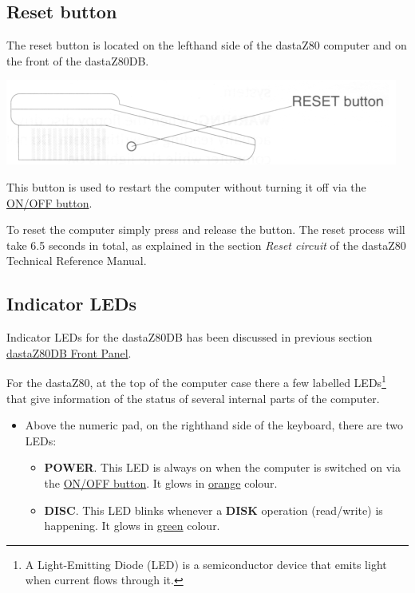     \subsection{Reset button}
    \label{subsec:resetbutton}

    The reset button is located on the lefthand side of the dastaZ80 computer
    and on the front of the dastaZ80DB.

    \includegraphics[scale=0.7]{images/resetbutton.png}

    This button is used to restart the computer without turning it off via the
    \hyperref[subsec:onoffbutt]{ON/OFF button}.

    To reset the computer simply press and release the button. The reset process
    will take 6.5 seconds in total, as explained in the section
    \textit{Reset circuit} of the dastaZ80 Technical Reference
    Manual\cite{dastaz80techman}.

    \subsection{Indicator LEDs}

    Indicator LEDs for the dastaZ80DB has been discussed in previous section
    \hyperref[subsec:frontpanel]{dastaZ80DB Front Panel}.

    For the dastaZ80, at the top of the computer case there a few labelled
    LEDs\footnote{A Light-Emitting Diode (LED) is a semiconductor device that
    emits light when current flows through it.} that give information of the
    status of several internal parts of the computer.

    \begin{itemize}
        \item Above the numeric pad, on the righthand side of the keyboard,
        there are two LEDs:
        \begin{itemize}
            \item \textbf{POWER}. This LED is always on when the computer is
            switched on via the \hyperref[subsec:onoffbutt]{ON/OFF button}. It glows
            in \underline{orange} colour.
            \item \textbf{DISC}. This LED blinks whenever a \textbf{DISK} operation
            (read/write) is happening. It glows in \underline{green} colour.
        \end{itemize}
    \end{itemize}
    
